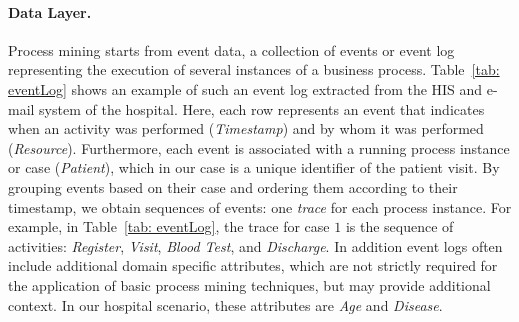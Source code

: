 \documentclass[manuscript]{acmart}
\begin{document}
\paragraph{Data Layer.} Process mining starts from event data, a collection of events or event log representing the execution of several instances of a business process. Table~\ref{tab: eventLog} shows an example of such an event log extracted from the HIS and e-mail system of the hospital. Here, each row represents an event that indicates when an activity was performed (\textit{Timestamp}) and by whom it was performed (\textit{Resource}). Furthermore, each event is associated with a running process instance or case (\textit{Patient}), which in our case is a unique identifier of the patient visit. By grouping events based on their case and ordering them according to their timestamp, we obtain sequences of events: one \emph{trace} for each process instance. For example, in Table~\ref{tab: eventLog}, the trace for case $1$ is the sequence of activities: \textit{Register}, \textit{Visit}, \textit{Blood Test}, and \textit{Discharge}. In addition event logs often include additional domain specific attributes, which are not strictly required for the application of basic process mining techniques, but may provide additional context. In our hospital scenario, these attributes are \textit{Age} and \textit{Disease}.
\end{document}
